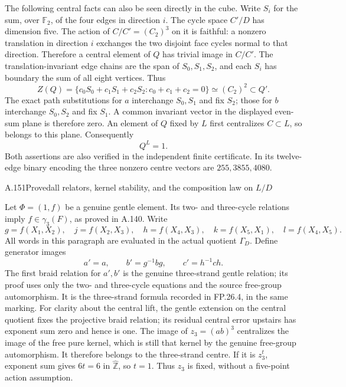 The following central facts can also be seen directly
in the cube. Write $S_i$ for the sum, over $\mathbb F_2$,
of the four edges in direction $i$. The cycle space
$C'/D$ has dimension five. The action of
$C/C'=(C_2)^3$ on it is faithful: a nonzero translation
in direction $i$ exchanges the two disjoint face
cycles normal to that direction. Therefore a central
element of $Q$ has trivial image in $C/C'$. The
translation-invariant edge chains are the span of
$S_0,S_1,S_2$, and each $S_i$ has boundary the sum
of all eight vertices. Thus
\[
 Z(Q)=\{c_0S_0+c_1S_1+c_2S_2:c_0+c_1+c_2=0\}
           \simeq(C_2)^2\subset Q'.
 \tag{GD.1a}
\]
The exact path substitutions for $a$ interchange
$S_0,S_1$ and fix $S_2$; those for $b$ interchange
$S_0,S_2$ and fix $S_1$. A common invariant vector
in the displayed even-sum plane is therefore zero.
An element of $Q$ fixed by $L$ first centralizes
$C\subset L$, so belongs to this plane. Consequently
\[
                              Q^L=1.
 \tag{GD.1b}
\]
Both assertions are also verified in the independent
finite certificate. In its twelve-edge binary
encoding the three nonzero centre vectors are
$255,3855,4080$.

\begin{statement}{A.151}{Proved}{all relators, kernel stability, and the composition law on $L/D$}
\end{statement}
Let $\Phi=(1,f)$ be a genuine gentle element. Its
two- and three-cycle relations imply
$f\in\gamma_3(F)$, as proved in A.140. Write
\[
 g=f(X_1,X_2),\quad j=f(X_2,X_3),\quad
 h=f(X_4,X_3),\quad k=f(X_5,X_1),\quad l=f(X_4,X_5).
\]
All words in this paragraph are evaluated in the
actual quotient $\Gamma_D$. Define generator images
\[
              a'=a,\qquad b'=g^{-1}bg,
                              \qquad c'=h^{-1}ch.
 \tag{GD.2a}
\]
The first braid relation for $a',b'$ is the genuine
three-strand gentle relation; its proof uses only
the two- and three-cycle equations and the source
free-group automorphism. It is the three-strand
formula recorded in FP.26.4, in the same marking.
For clarity about the central lift, the gentle
extension on the central quotient fixes the
projective braid relation; its residual central
error upstairs has exponent sum zero and hence
is one. The image of $z_3=(ab)^3$ centralizes the
image of the free pure kernel, which is still
that kernel by the genuine free-group
automorphism. It therefore belongs to the
three-strand centre. If it is $z_3^t$, exponent
sum gives $6t=6$ in $\widehat{\mathbb Z}$,
so $t=1$. Thus $z_3$ is fixed, without a
five-point action assumption.

